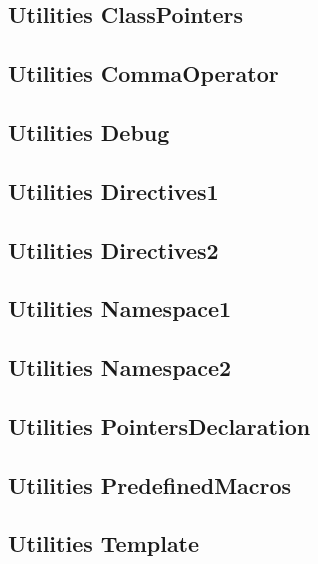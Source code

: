 \subsection{Utilities ClassPointers}
\raggedbottom
\hrulefill
\subsection{Utilities CommaOperator}
\raggedbottom
\hrulefill
\subsection{Utilities Debug}
\raggedbottom
\hrulefill
\subsection{Utilities Directives1}
\raggedbottom
\hrulefill
\subsection{Utilities Directives2}
\raggedbottom
\hrulefill
\subsection{Utilities Namespace1}
\raggedbottom
\hrulefill
\subsection{Utilities Namespace2}
\raggedbottom
\hrulefill
\subsection{Utilities PointersDeclaration}
\raggedbottom
\hrulefill
\subsection{Utilities PredefinedMacros}
\raggedbottom
\hrulefill
\subsection{Utilities Template}
\raggedbottom
\hrulefill

